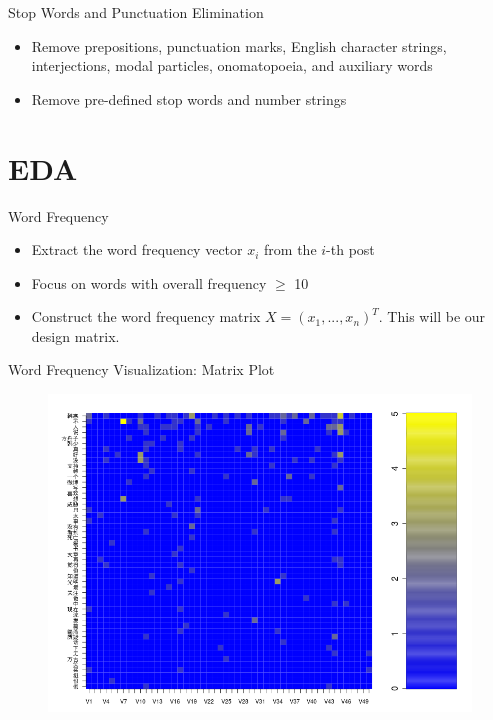 \documentclass[12pt]{beamer}
\newcommand{\1}[1]{{\mathbf 1}\left\{#1\right\}}        %
\begin{document}
\begin{frame}{Stop Words and Punctuation Elimination}

\begin{itemize}[<+->]
\item Remove prepositions, punctuation marks, English character strings, interjections, modal particles, onomatopoeia, and auxiliary words
\item Remove pre-defined stop words and number strings
\end{itemize}

\end{frame}



\section{EDA}


\begin{frame}{Word Frequency}
\begin{itemize}[<+->]
\item Extract the word frequency vector $x_i$ from the $i$-th post
\item Focus on words with overall frequency $\geq$ 10
\item Construct the word frequency matrix $X=(x_1,...,x_n)^T$. This will be our design matrix.
\end{itemize}
\end{frame}


\begin{frame}{Word Frequency Visualization: Matrix Plot}

\begin{figure}
  \centering
  \includegraphics[height=0.9\textheight]{./../../wordFreqMat.png} 
\end{figure}


\end{frame}
\end{document}
